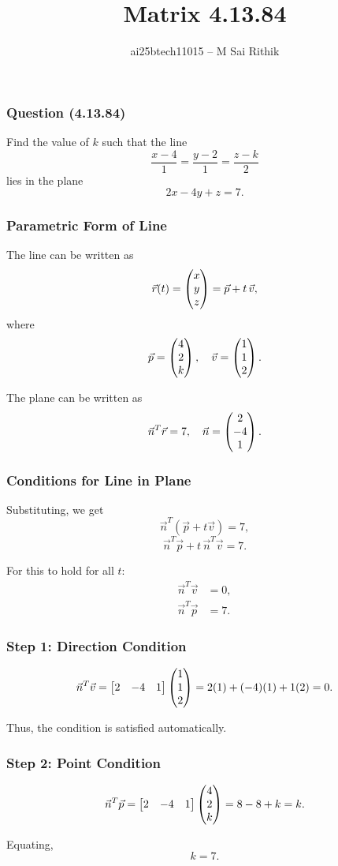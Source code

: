 \documentclass{beamer}
\title{Matrix 4.13.84}
\author{ai25btech11015 -- M Sai Rithik}
\date{}
\begin{document}
\maketitle

\begin{frame}
\frametitle{Question (4.13.84)}
Find the value of \(k\) such that the line
\[
\frac{x-4}{1}=\frac{y-2}{1}=\frac{z-k}{2}
\]
lies in the plane
\[
2x-4y+z=7.
\]
\end{frame}

\begin{frame}
\frametitle{Parametric Form of Line}
The line can be written as
\[
\Vec{r}(t) = \begin{pmatrix}x\\y\\z\end{pmatrix} = \Vec{p} + t\,\Vec{v},
\]
where
\[
\Vec{p} = \begin{pmatrix}4\\2\\k\end{pmatrix}, \quad 
\Vec{v} = \begin{pmatrix}1\\1\\2\end{pmatrix}.
\]

The plane can be written as
\[
\Vec{n}^T \Vec{r} = 7,
\quad \Vec{n} = \begin{pmatrix}2\\-4\\1\end{pmatrix}.
\]
\end{frame}

\begin{frame}
\frametitle{Conditions for Line in Plane}
Substituting, we get
\[
\Vec{n}^T(\Vec{p} + t \Vec{v}) = 7,
\]
\[
\Vec{n}^T \Vec{p} + t\,\Vec{n}^T \Vec{v} = 7.
\]

For this to hold for all \(t\):
\begin{align}
\Vec{n}^T \Vec{v} &= 0, \\
\Vec{n}^T \Vec{p} &= 7.
\end{align}
\end{frame}

\begin{frame}
\frametitle{Step 1: Direction Condition}
\[
\Vec{n}^T \Vec{v}
= \begin{bmatrix}2 & -4 & 1\end{bmatrix}
\begin{pmatrix}1\\1\\2\end{pmatrix}
= 2(1) + (-4)(1) + 1(2) = 0.
\]

Thus, the condition is satisfied automatically.
\end{frame}

\begin{frame}
\frametitle{Step 2: Point Condition}
\[
\Vec{n}^T \Vec{p}
= \begin{bmatrix}2 & -4 & 1\end{bmatrix}
\begin{pmatrix}4\\2\\k\end{pmatrix}
= 8 - 8 + k = k.
\]

Equating,
\[
k = 7.
\]
\end{frame}
\end{document}
